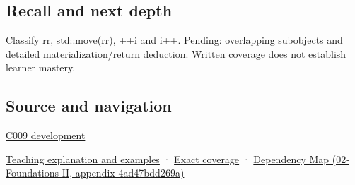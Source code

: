 \subsection{Recall and next depth}\label{recall-and-next-depth}

Classify rr, std::move(rr), ++i and i++. Pending: overlapping subobjects and detailed materialization/return deduction. Written coverage does not establish learner mastery.

\subsection{Source and navigation}\label{source-and-navigation}

\hyperref[appendix-fd090d982a15]{C009 development}

\href{Continuous\%20Notes/Computing\%20Foundations\%20-\%20From\%20Bits\%20to\%20C++\%20and\%20Systems\%20APIs\#An\%20expression\%20has\%20a\%20type\%20and\%20a\%20category}{Teaching explanation and examples} · \hyperref[appendix-fd090d982a15]{Exact coverage} · \href{}{Dependency Map (02-Foundations-II, appendix-4ad47bdd269a)}
